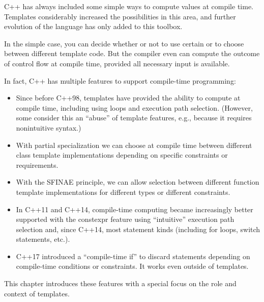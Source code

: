 C++ has always included some simple ways to compute values at compile time. Templates considerably increased the possibilities in this area, and further evolution of the language has only added to this toolbox.

In the simple case, you can decide whether or not to use certain or to choose between different template code. But the compiler even can compute the outcome of control flow at compile time, provided all necessary input is available.

In fact, C++ has multiple features to support compile-time programming:

\begin{itemize}
\item 
Since before C++98, templates have provided the ability to compute at compile time, including using loops and execution path selection. (However, some consider this an “abuse” of template features, e.g., because it requires nonintuitive syntax.)

\item 
With partial specialization we can choose at compile time between different class template implementations depending on specific constraints or requirements.

\item 
With the SFINAE principle, we can allow selection between different function template implementations for different types or different constraints.

\item 
 In C++11 and C++14, compile-time computing became increasingly better supported with the constexpr feature using “intuitive” execution path selection and, since C++14, most statement kinds (including for loops, switch statements, etc.).

\item 
C++17 introduced a “compile-time if” to discard statements depending on compile-time conditions or constraints. It works even outside of templates.
\end{itemize}

This chapter introduces these features with a special focus on the role and context of templates.


